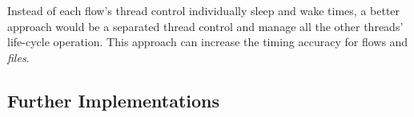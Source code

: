 Instead of each flow's thread control individually sleep and wake times, a better approach would be a separated thread control and manage all the other threads' life-cycle operation. This approach can increase the timing accuracy for flows and \textit{files}.





\subsection{Further Implementations}


